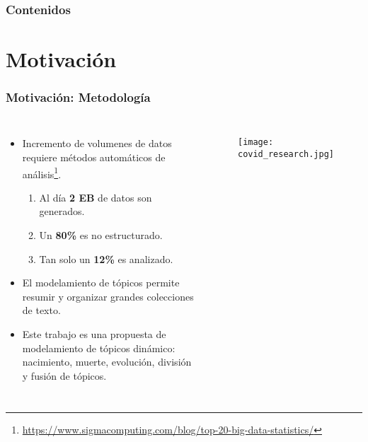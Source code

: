 \documentclass[
	spanish, %
	aspectratio=43, %
	hyperref={pdfencoding=auto,psdextra},
	xcolor={dvipsnames,table,usenames},
]{beamer}
\title[\documentsubtitle]{\documenttitle}
\subtitle{\documentsubject}
\author[\documentauthor]{
	\documentauthor \newline\newline
Profesor guía: Richard Weber \newline
Miembros de la comisión: Ángel Jiménez, Giorgiogiulio Parra
}
\institute[UChile]{
	\texttt{[image: \\universitydepartmentimage]} \\
	\medskip
	\universityname \\
	\universityfaculty \\
	\universitydepartment
}
\date[\today]{\footnotesize{\today}}
\begin{document}
\templatePagecfg

\templateFinalcfg

\newcommand\blfootnote[1]{%
  \begingroup
  \renewcommand\thefootnote{}\footnote{#1}%
  \addtocounter{footnote}{-1}%
  \endgroup
}

\begin{frame}
	\titlepage
\end{frame}


\begin{frame}
	\frametitle{Contenidos}
	\tableofcontents
\end{frame}


\section{Motivación}

\begin{frame}[t]
\frametitle{Motivación: Metodología}
  
\begin{columns}
\begin{itemize}
  \item Incremento de volumenes de datos requiere métodos automáticos de análisis\footnote{\url{https://www.sigmacomputing.com/blog/top-20-big-data-statistics/}}.
     \begin{enumerate}
      \item Al día \textbf{2 EB} de datos son generados.
      \item Un \textbf{80\%} es no estructurado.
      \item Tan solo un \textbf{12\%} es analizado.
    \end{enumerate}
  \item 
    El modelamiento de tópicos permite resumir y organizar grandes colecciones de texto. %
    \item Este trabajo es una propuesta de modelamiento de tópicos dinámico: nacimiento, muerte, evolución, división y fusión de tópicos.
  \end{itemize}

\begin{figure}
  \texttt{[image: covid\_research.jpg]} 
 \end{figure}
 \end{columns}
\end{frame}
\end{document}
